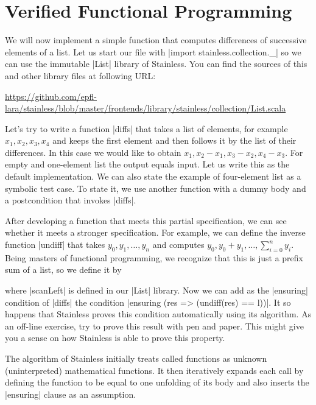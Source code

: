 \section{Verified Functional Programming}

We will now implement a simple function that computes
differences of successive elements of a list.
Let us start our file with |import stainless.collection._|
so we can use the immutable |List| library of Stainless.
You can find the sources of this and other library files at following URL:
\begin{center}
  \url{https://github.com/epfl-lara/stainless/blob/master/frontends/library/stainless/collection/List.scala}
\end{center}
Let's try to write a function |diffs| that takes a list of elements, for example
$x_1, x_2, x_3, x_4$ and keeps the first element and then follows it by the list of their differences. In this case
we would like to obtain $x_1, x_2 - x_1, x_3 - x_2, x_4 - x_3$. For empty and one-element list the output equals input.
Let us write this as the default implementation. We can also state the example of four-element list as a symbolic test
case. To state it, we use another function with a dummy body and a postcondition that invokes |diffs|.

After developing a function that meets this partial specification, we can see whether it meets a stronger specification.
For example, we can define the inverse function |undiff| that takes $y_0, y_1, \ldots, y_n$ and computes
$y_0, y_0 + y_1, \ldots, \sum_{i=0}^n y_i$. Being masters of functional programming, we recognize that this is just
a prefix sum of a list, so we define it by

where |scanLeft| is defined in our |List| library.
Now we can add as the |ensuring| condition of |diffs| the condition
|ensuring (res => (undiff(res) == l))|. It so happens that Stainless
proves this condition automatically using its algorithm. As an off-line exercise,
try to prove this result with pen and paper. This might give you a sense on
how Stainless is able to prove this property.

The algorithm of Stainless initially treats called functions as unknown (uninterpreted) mathematical
functions. It then iteratively expands each
call by defining the function to be equal to one unfolding of its body and also inserts the |ensuring| clause
as an assumption.
